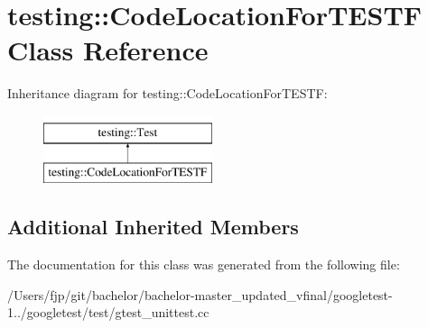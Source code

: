 \hypertarget{classtesting_1_1_code_location_for_t_e_s_t_f}{}\section{testing\+:\+:Code\+Location\+For\+T\+E\+S\+TF Class Reference}
\label{classtesting_1_1_code_location_for_t_e_s_t_f}
Inheritance diagram for testing\+:\+:Code\+Location\+For\+T\+E\+S\+TF\+:\begin{figure}[H]
\begin{center}
\leavevmode
\includegraphics[height=2.000000cm]{classtesting_1_1_code_location_for_t_e_s_t_f}
\end{center}
\end{figure}
\subsection*{Additional Inherited Members}


The documentation for this class was generated from the following file\+:\begin{DoxyCompactItemize}
\item 
/\+Users/fjp/git/bachelor/bachelor-\/master\+\_\+updated\+\_\+vfinal/googletest-\/1../googletest/test/gtest\+\_\+unittest.\+cc\end{DoxyCompactItemize}
